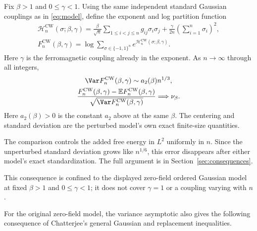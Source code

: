 \begin{corollary}
\label{cor:skcw}
Fix $\beta>1$ and $0\le\gamma<1$. Using the same independent standard
Gaussian couplings as in \eqref{eq:model}, define the exponent and log
partition function
\[
 \begin{gathered}
 \mathcal H_n^{\mathrm{CW}}(\sigma;\beta,\gamma)
 =
 \frac{\beta}{\sqrt n}\sum_{1\le i<j\le n}g_{ij}\sigma_i\sigma_j
 +\frac{\gamma}{2n}\left(\sum_{i=1}^n\sigma_i\right)^2,\\
 F_n^{\mathrm{CW}}(\beta,\gamma)
 =\log\sum_{\sigma\in\{-1,1\}^n}
 e^{\mathcal H_n^{\mathrm{CW}}(\sigma;\beta,\gamma)}.
 \end{gathered}
\]
Here $\gamma$ is the ferromagnetic coupling already in the exponent.
As $n\to\infty$ through all integers,
\[
 \begin{gathered}
 \Var F_n^{\mathrm{CW}}(\beta,\gamma)
 \sim a_2(\beta)n^{1/3},\\
 \frac{F_n^{\mathrm{CW}}(\beta,\gamma)
       -\mathbb E F_n^{\mathrm{CW}}(\beta,\gamma)}
      {\sqrt{\Var F_n^{\mathrm{CW}}(\beta,\gamma)}}
 \Longrightarrow\nu_\beta.
 \end{gathered}
\]
Here $a_2(\beta)>0$ is the constant $a_2$ above at the same $\beta$.
The centering and standard deviation are the perturbed model's own
exact finite-size quantities.
\end{corollary}

The comparison controls the added free energy in $L^2$ uniformly in
$n$. Since the unperturbed standard deviation grows like $n^{1/6}$,
this error disappears after either model's exact standardization.
The full argument is in Section~\ref{sec:consequences}.

This consequence is confined to the displayed zero-field ordered
Gaussian model at fixed $\beta>1$ and $0\le\gamma<1$; it does not cover
$\gamma=1$ or a coupling varying with $n$.

For the original zero-field model, the variance asymptotic also gives
the following consequence of Chatterjee's general Gaussian and
replacement inequalities.

